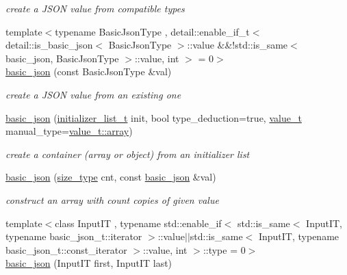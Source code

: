 \begin{DoxyCompactItemize}
\begin{DoxyCompactList}\small\item\em create a J\+S\+ON value from compatible types \end{DoxyCompactList}\item 
{\footnotesize template$<$typename Basic\+Json\+Type , detail\+::enable\+\_\+if\+\_\+t$<$ detail\+::is\+\_\+basic\+\_\+json$<$ Basic\+Json\+Type $>$\+::value \&\&!std\+::is\+\_\+same$<$ basic\+\_\+json, Basic\+Json\+Type $>$\+::value, int $>$  = 0$>$ }\\\hyperlink{classnlohmann_1_1basic__json_a40738eb9cb8c5a9ca14ae4b697c29f8e}{basic\+\_\+json} (const Basic\+Json\+Type \&val)
\begin{DoxyCompactList}\small\item\em create a J\+S\+ON value from an existing one \end{DoxyCompactList}\item 
\hyperlink{classnlohmann_1_1basic__json_aeac617faf3448d6d2cb33a020be01d37}{basic\+\_\+json} (\hyperlink{classnlohmann_1_1basic__json_ac569f292a070dfd2f6b69c16e746095a}{initializer\+\_\+list\+\_\+t} init, bool type\+\_\+deduction=true, \hyperlink{namespacenlohmann_1_1detail_a1ed8fc6239da25abcaf681d30ace4985}{value\+\_\+t} manual\+\_\+type=\hyperlink{namespacenlohmann_1_1detail_a1ed8fc6239da25abcaf681d30ace4985af1f713c9e000f5d3f280adbd124df4f5}{value\+\_\+t\+::array})
\begin{DoxyCompactList}\small\item\em create a container (array or object) from an initializer list \end{DoxyCompactList}\item 
\hyperlink{classnlohmann_1_1basic__json_afbccea367512a87b5d76e2bd92c5cc85}{basic\+\_\+json} (\hyperlink{classnlohmann_1_1basic__json_a3ada29bca70b4965f6fd37ec1c8f85f7}{size\+\_\+type} cnt, const \hyperlink{classnlohmann_1_1basic__json}{basic\+\_\+json} \&val)
\begin{DoxyCompactList}\small\item\em construct an array with count copies of given value \end{DoxyCompactList}\item 
{\footnotesize template$<$class Input\+IT , typename std\+::enable\+\_\+if$<$ std\+::is\+\_\+same$<$ Input\+I\+T, typename basic\+\_\+json\+\_\+t\+::iterator $>$\+::value$\vert$$\vert$std\+::is\+\_\+same$<$ Input\+I\+T, typename basic\+\_\+json\+\_\+t\+::const\+\_\+iterator $>$\+::value, int $>$\+::type  = 0$>$ }\\\hyperlink{classnlohmann_1_1basic__json_a23e540f473d32f1cf5d3243ea3ad495e}{basic\+\_\+json} (Input\+IT first, Input\+IT last)

\end{DoxyCompactItemize}
